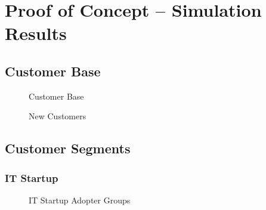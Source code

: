 \chapter{Proof of Concept -- Simulation Results}\label{ch:app05}

\section{Customer Base}\label{ch:app05:cb}

\begin{figure}[htb]
	\centering
	
	\caption{Customer Base}
\end{figure}

\begin{figure}[htb]
	\centering
	
	\caption{New Customers}
\end{figure}



\newpage
\section{Customer Segments}\label{ch:app05:cs}

	\subsection{IT Startup}\label{ch:app05:cs:its}

	\begin{figure}[htb]
		\centering
		
		\caption{IT Startup Adopter Groups}
	\end{figure}

